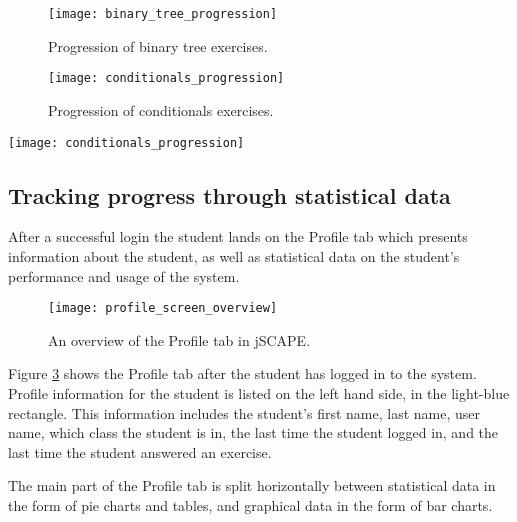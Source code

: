 \newpage
\begin{figure}[H]
\centering
\texttt{[image: binary\_tree\_progression]}
\caption{Progression of binary tree exercises.}
\label{fig:binary_tree_progression}
\end{figure}

\begin{figure}[H]
\centering
\texttt{[image: conditionals\_progression]}
\caption{Progression of conditionals exercises.}
\label{fig:conditionals_progression}
\end{figure}

\begin{sidewaysfigure}
\centering
\texttt{[image: conditionals\_progression]}
\caption{Progression of conditionals exercises.}
\label{fig:conditionals_progression}
\end{sidewaysfigure}

\subsection{Tracking progress through statistical data}
\label{subsec:tracking-progress}
After a successful login the student lands on the Profile tab which presents information about the student, as well as statistical data on the student's performance and usage of the system.

\begin{figure}[H]
\centering
\texttt{[image: profile\_screen\_overview]}
\caption{An overview of the Profile tab in jSCAPE.}
\label{fig:profile_screen_overview}
\end{figure}

Figure \ref{fig:profile_screen_overview} shows the Profile tab after the student has logged in to the system. Profile information for the student is listed on the left hand side, in the light-blue rectangle. This information includes the student's first name, last name, user name, which class the student is in, the last time the student logged in, and the last time the student answered an exercise. \newline

The main part of the Profile tab is split horizontally between statistical data in the form of pie charts and tables, and graphical data in the form of bar charts. \newline

